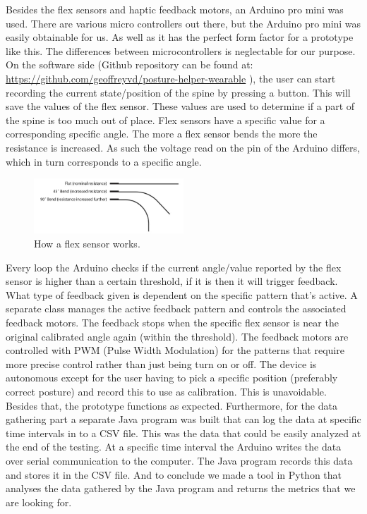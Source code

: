 \documentclass[sigconf]{acmart}
\begin{document}
Besides the flex sensors and haptic feedback motors, an Arduino pro mini was used. There are various micro controllers out there, but the Arduino pro mini was easily obtainable for us. As well as it has the perfect form factor for a prototype like this. The differences between microcontrollers is neglectable for our purpose.
On the software side (Github repository can be found at: \url{https://github.com/geoffreyvd/posture-helper-wearable} ), the user can start recording the current state/position of the spine by pressing a button. This will save the values of the flex sensor. These values are used to determine if a part of the spine is too much out of place. Flex sensors have a specific value for a corresponding specific angle. The more a flex sensor bends the more the resistance is increased. As such the voltage read on the pin of the Arduino differs, which in turn corresponds to a specific angle.

\begin{figure}[bh]
\centering
\includegraphics[width=0.5\textwidth, scale=1]{FlexSensor_work.jpg}
\caption{How a flex sensor works.}
\end{figure}


Every loop the Arduino checks if the current angle/value reported by the flex sensor is higher than a certain threshold, if it is then it will trigger feedback. What type of feedback given is dependent on the specific pattern that's active. A separate class manages the active feedback pattern and controls the associated feedback motors. The feedback stops when the specific flex sensor is near the original calibrated angle again (within the threshold). The feedback motors are controlled with PWM (Pulse Width Modulation) for the patterns that require more precise control rather than just being turn on or off.
The device is autonomous except for the user having to pick a specific position (preferably correct posture) and record this to use as calibration. This is unavoidable. Besides that, the prototype functions as expected.
Furthermore, for the data gathering part a separate Java program was built that can log the data at specific time intervals in to a CSV file. This was the data that could be easily analyzed at the end of the testing. At a specific time interval the Arduino writes the data over serial communication to the computer. The Java program records this data and stores it in the CSV file.
And to conclude we made a tool in Python that analyses the data gathered by the Java program and returns the metrics that we are looking for.
\end{document}
